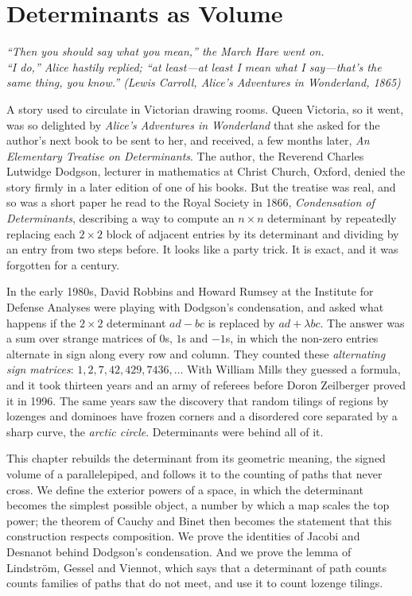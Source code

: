 \chapter{Determinants as Volume}\label{linear:ch:volume}

\begin{center}\itshape
``Then you should say what you mean,'' the March Hare went on.\\
``I do,'' Alice hastily replied; ``at least---at least I mean what I say---that's the same thing, you know.''
\upshape(Lewis Carroll, \emph{Alice's Adventures in Wonderland}, 1865)
\end{center}

A story used to circulate in Victorian drawing rooms. Queen Victoria, so it went, was so delighted by \emph{Alice's
Adventures in Wonderland} that she asked for the author's next book to be sent to her, and received, a few months later,
\emph{An Elementary Treatise on Determinants}. The author, the Reverend Charles Lutwidge Dodgson, lecturer in mathematics
at Christ Church, Oxford, denied the story firmly in a later edition of one of his books. But the treatise was real,
and so was a short paper he read to the Royal Society in 1866, \emph{Condensation of Determinants}, describing a way to
compute an $n\times n$ determinant by repeatedly replacing each $2\times2$ block of adjacent entries by its determinant
and dividing by an entry from two steps before. It looks like a party trick. It is exact, and it was forgotten for a
century.

In the early 1980s, David Robbins and Howard Rumsey at the Institute for Defense Analyses were playing with Dodgson's
condensation, and asked what happens if the $2\times2$ determinant $ad-bc$ is replaced by $ad+\lambda bc$. The answer
was a sum over strange matrices of $0$s, $1$s and $-1$s, in which the non-zero entries alternate in sign along every row
and column. They counted these \emph{alternating sign matrices}: $1,2,7,42,429,7436,\dots$ With William Mills they
guessed a formula, and it took thirteen years and an army of referees before Doron Zeilberger proved it in 1996. The
same years saw the discovery that random tilings of regions by lozenges and dominoes have frozen corners and a
disordered core separated by a sharp curve, the \emph{arctic circle}. Determinants were behind all of it.

This chapter rebuilds the determinant from its geometric meaning, the signed volume of a parallelepiped, and follows it
to the counting of paths that never cross. We define the exterior powers of a space, in which the determinant becomes
the simplest possible object, a number by which a map scales the top power; the theorem of Cauchy and Binet then becomes
the statement that this construction respects composition. We prove the identities of Jacobi and Desnanot behind
Dodgson's condensation. And we prove the lemma of Lindstr\"om, Gessel and Viennot, which says that a determinant of path
counts counts families of paths that do not meet, and use it to count lozenge tilings.


